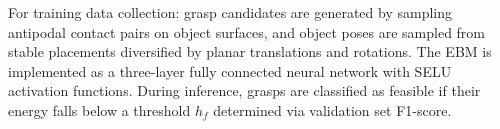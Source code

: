 \documentclass[journal, twoside]{IEEEtran}
\begin{document}
For training data collection: grasp candidates are generated by sampling antipodal contact pairs on object surfaces, and object poses are sampled from stable placements diversified by planar translations and rotations. The EBM is implemented as a three-layer fully connected neural network with SELU activation functions. During inference, grasps are classified as feasible if their energy falls below a threshold $h_f$ determined via validation set F1-score.
\end{document}
